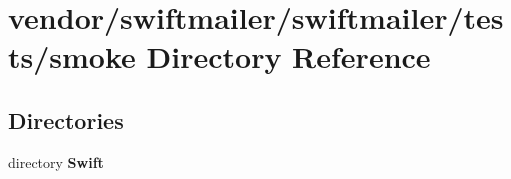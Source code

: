 \section{vendor/swiftmailer/swiftmailer/tests/smoke Directory Reference}
\label{dir_ff66f1f0bd7873169f8b9b8fdff64599}
\subsection*{Directories}
\begin{DoxyCompactItemize}
\item 
directory {\bf Swift}
\end{DoxyCompactItemize}
